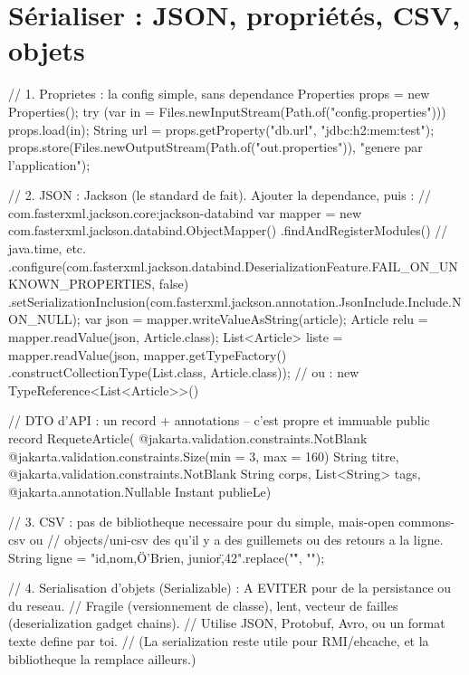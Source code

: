 \documentclass[12pt,a4paper,twoside,openright]{book}
\begin{document}
\section{S\'erialiser : JSON, propri\'et\'es, CSV, objets}

\begin{codejava}
// 1. Proprietes : la config simple, sans dependance
Properties props = new Properties();
try (var in = Files.newInputStream(Path.of("config.properties"))) { props.load(in); }
String url = props.getProperty("db.url", "jdbc:h2:mem:test");
props.store(Files.newOutputStream(Path.of("out.properties")), "genere par l'application");

// 2. JSON : Jackson (le standard de fait). Ajouter la dependance, puis :
//    com.fasterxml.jackson.core:jackson-databind
var mapper = new com.fasterxml.jackson.databind.ObjectMapper()
        .findAndRegisterModules()                       // java.time, etc.
        .configure(com.fasterxml.jackson.databind.DeserializationFeature.FAIL_ON_UNKNOWN_PROPERTIES, false)
        .setSerializationInclusion(com.fasterxml.jackson.annotation.JsonInclude.Include.NON_NULL);
var json = mapper.writeValueAsString(article);
Article relu = mapper.readValue(json, Article.class);
List<Article> liste = mapper.readValue(json, mapper.getTypeFactory()
        .constructCollectionType(List.class, Article.class));   // ou : new TypeReference<List<Article>>() {}

// DTO d'API : un record + annotations -- c'est propre et immuable
public record RequeteArticle(
        @jakarta.validation.constraints.NotBlank @jakarta.validation.constraints.Size(min = 3, max = 160) String titre,
        @jakarta.validation.constraints.NotBlank String corps,
        List<String> tags,
        @jakarta.annotation.Nullable Instant publieLe) { }

// 3. CSV : pas de bibliotheque necessaire pour du simple, mais-open commons-csv ou
//    objects/uni-csv des qu'il y a des guillemets ou des retours a la ligne.
String ligne = "id,nom,\"O'Brien, junior\",42\n".replace("\r", "");

// 4. Serialisation d'objets (Serializable) : A EVITER pour de la persistance ou du reseau.
//    Fragile (versionnement de classe), lent, vecteur de failles (deserialization gadget chains).
//    Utilise JSON, Protobuf, Avro, ou un format texte define par toi.
//    (La serialization reste utile pour RMI/ehcache, et la bibliotheque la remplace ailleurs.)
\end{codejava}
\end{document}
